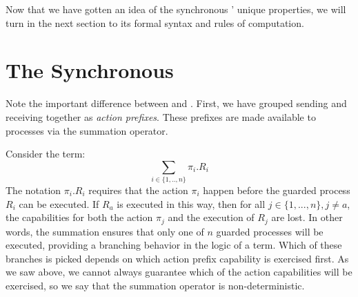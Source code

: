 Now that we have gotten an idea of the synchronous \picalc' unique properties, we will turn in the next section to its formal syntax and rules of computation.

\section{The Synchronous \Picalc}\label{Synchronous picalc}


Note the important difference between  and .  
First, we have grouped sending and receiving together as \emph{action prefixes}. 
These prefixes are made available to processes via the summation operator. 

Consider the term:
\[
	\sum_{i\in \{1,..,n\}} \pi_i.R_i
\]
The notation $\pi_i.R_i$ requires that the action $\pi_i$ happen before the guarded process $R_i$ can be executed.  
If $R_a$ is executed in this way, then for all $j\in \{1,...,n\},j \neq a$, the capabilities for both the action $\pi_j$ and the execution of $R_j$ are lost.  
In other words, the summation ensures that only one of $n$ guarded processes will be executed, providing a branching behavior in the logic of a term. 
Which of these branches is picked depends on which action prefix capability is exercised first.  As we saw above, we cannot always guarantee which of the action capabilities will be exercised, so we say that the summation operator is non-deterministic.

